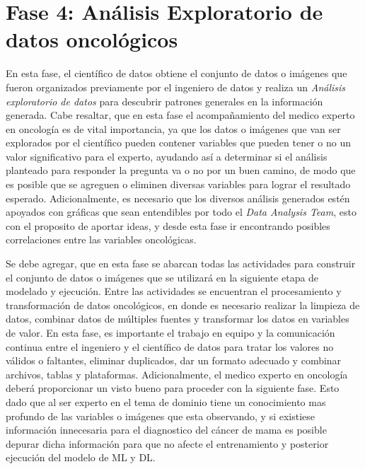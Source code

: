 \section{Fase 4: Análisis Exploratorio de datos oncológicos}

En esta fase, el científico de datos obtiene el conjunto de datos o imágenes que fueron organizados previamente por el ingeniero de datos y realiza un \textit{Análisis exploratorio de datos} para descubrir patrones generales en la información generada. Cabe resaltar, que en esta fase el acompañamiento del medico experto en oncología es de vital importancia, ya que los datos o imágenes que van ser explorados por el científico pueden contener variables que pueden tener o no un valor significativo para el experto, ayudando así a determinar si el análisis planteado para responder la pregunta va o no por un buen camino, de modo que es posible que se agreguen o eliminen diversas variables para lograr el resultado esperado. Adicionalmente, es necesario que los diversos análisis generados estén apoyados con gráficas que sean entendibles por todo el \textit{Data Analysis Team}, esto con el proposito de aportar ideas, y desde esta fase ir encontrando posibles correlaciones entre las variables oncológicas.

Se debe agregar, que en esta fase se abarcan todas las actividades para construir el conjunto de datos o imágenes que se utilizará en la siguiente etapa de modelado y ejecución. Entre las actividades se encuentran el procesamiento y transformación de datos oncológicos, en donde es necesario realizar la limpieza de datos, combinar datos de múltiples fuentes y transformar los datos en variables de valor. En esta fase, es importante el trabajo en equipo y la comunicación continua entre el ingeniero y el científico de datos para tratar los valores no válidos o faltantes, eliminar duplicados, dar un formato adecuado y combinar archivos, tablas y plataformas. Adicionalmente, el medico experto en oncología deberá proporcionar un visto bueno para proceder con la siguiente fase. Esto dado que al ser experto en el tema de dominio tiene un conocimiento mas profundo de las variables o imágenes que esta observando, y si existiese información innecesaria para el diagnostico del cáncer de mama es posible depurar dicha información para que no afecte el entrenamiento y posterior ejecución del modelo de ML y DL.

\newpage
